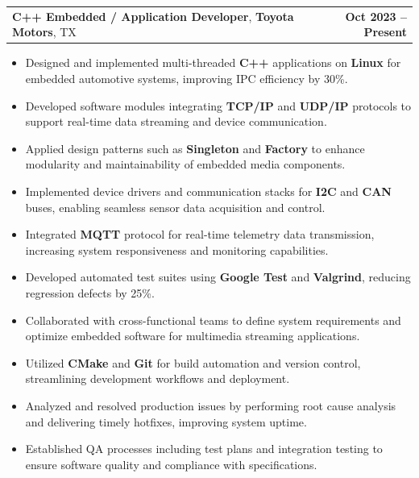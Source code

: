 \documentclass[letterpaper,11pt]{article}
\makeatletter
\newcommand{\resumeItem}[1]{
  \item\footnotesize{
    {#1 \vspace{-2pt}}
  }
}
\newcommand{\resumeSubheading}[4]{
  \vspace{-2pt}\item
    \begin{tabular*}{1.0\textwidth}[t]{l@{\extracolsep{\fill}}r}
      \textbf{\fontsize{10pt}{14pt}\selectfont #3}, \textbf{\fontsize{10pt}{14pt}\selectfont #1}, \fontsize{10pt}{14pt}\selectfont #4 & \textbf{\fontsize{10pt}{14pt}\selectfont #2} \\
    \end{tabular*}\vspace{-7pt}
}
\newcommand{\resumeItemListStart}{\begin{itemize}[leftmargin=*]}
\newcommand{\resumeItemListEnd}{\end{itemize}\vspace{-5pt}}
\makeatother
\begin{document}
    \resumeSubheading
        {Toyota Motors}{Oct 2023 -- Present}
        {C++ Embedded / Application Developer}{TX}
      \resumeItemListStart
        \resumeItem{Designed and implemented multi-threaded \textbf{C++} applications on \textbf{Linux} for embedded automotive systems, improving IPC efficiency by 30\%.}
        \resumeItem{Developed software modules integrating \textbf{TCP/IP} and \textbf{UDP/IP} protocols to support real-time data streaming and device communication.}
        \resumeItem{Applied design patterns such as \textbf{Singleton} and \textbf{Factory} to enhance modularity and maintainability of embedded media components.}
        \resumeItem{Implemented device drivers and communication stacks for \textbf{I2C} and \textbf{CAN} buses, enabling seamless sensor data acquisition and control.}
        \resumeItem{Integrated \textbf{MQTT} protocol for real-time telemetry data transmission, increasing system responsiveness and monitoring capabilities.}
        \resumeItem{Developed automated test suites using \textbf{Google Test} and \textbf{Valgrind}, reducing regression defects by 25\%.}
        \resumeItem{Collaborated with cross-functional teams to define system requirements and optimize embedded software for multimedia streaming applications.}
        \resumeItem{Utilized \textbf{CMake} and \textbf{Git} for build automation and version control, streamlining development workflows and deployment.}
        \resumeItem{Analyzed and resolved production issues by performing root cause analysis and delivering timely hotfixes, improving system uptime.}
        \resumeItem{Established QA processes including test plans and integration testing to ensure software quality and compliance with specifications.}
      \resumeItemListEnd
\end{document}
